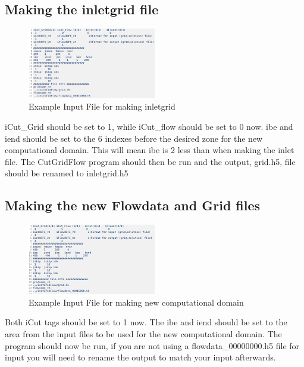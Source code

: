 \documentclass[12pt, oneside]{article}
\begin{document}
\subsection{Making the inletgrid file }

\begin{figure}[H]
\centering
\includegraphics[width=0.5\textwidth]{FIGS/ExampleInletgrid.png}

\caption{{\footnotesize Example Input File for making inletgrid}}
\label{fig: } 
\end{figure}

iCut\_Grid should be set to 1, while iCut\_flow should be set to 0 now. \newline
ibe and iend should be set to the 6 indexes before the desired zone for the new computational domain. This will mean ibe is 2 less than when making the inlet file. \newline
The CutGridFlow program should then be run and the output, grid.h5, file should be renamed to inletgrid.h5



\subsection{Making the new Flowdata and Grid files}

\begin{figure}[H]
\centering
\includegraphics[width=0.5\textwidth]{FIGS/ExampleInputND.png}

\caption{{\footnotesize Example Input File for making new computational domain}}
\label{fig: } 
\end{figure}

Both iCut tags should be set to 1 now. \newline
The ibe and iend should be set to the area from the input files to be used for the new computational domain. \newline
The program should now be run, if you are not using a flowdata\_00000000.h5 file for input you will need to rename the output to match your input afterwards.
\end{document}
